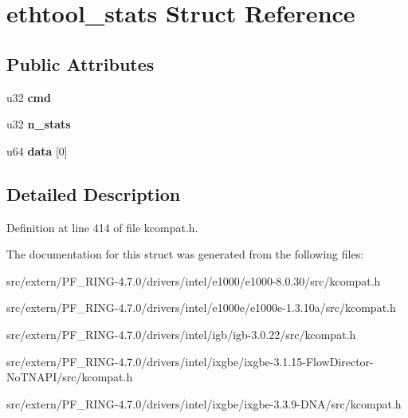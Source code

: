 \hypertarget{structethtool__stats}{
\section{ethtool\_\-stats Struct Reference}
\label{structethtool__stats}
}
\subsection*{Public Attributes}
\begin{DoxyCompactItemize}
\item 
\hypertarget{structethtool__stats_a73d226ea110979401143e4111a92776a}{
u32 {\bfseries cmd}}
\label{structethtool__stats_a73d226ea110979401143e4111a92776a}

\item 
\hypertarget{structethtool__stats_a49f61bf468066b5ad13e2f3fed458bbc}{
u32 {\bfseries n\_\-stats}}
\label{structethtool__stats_a49f61bf468066b5ad13e2f3fed458bbc}

\item 
\hypertarget{structethtool__stats_a639a1790cdc4aeb4c5251a54e637c1f3}{
u64 {\bfseries data} \mbox{[}0\mbox{]}}
\label{structethtool__stats_a639a1790cdc4aeb4c5251a54e637c1f3}

\end{DoxyCompactItemize}


\subsection{Detailed Description}


Definition at line 414 of file kcompat.h.



The documentation for this struct was generated from the following files:\begin{DoxyCompactItemize}
\item 
src/extern/PF\_\-RING-\/4.7.0/drivers/intel/e1000/e1000-\/8.0.30/src/kcompat.h\item 
src/extern/PF\_\-RING-\/4.7.0/drivers/intel/e1000e/e1000e-\/1.3.10a/src/kcompat.h\item 
src/extern/PF\_\-RING-\/4.7.0/drivers/intel/igb/igb-\/3.0.22/src/kcompat.h\item 
src/extern/PF\_\-RING-\/4.7.0/drivers/intel/ixgbe/ixgbe-\/3.1.15-\/FlowDirector-\/NoTNAPI/src/kcompat.h\item 
src/extern/PF\_\-RING-\/4.7.0/drivers/intel/ixgbe/ixgbe-\/3.3.9-\/DNA/src/kcompat.h\end{DoxyCompactItemize}
